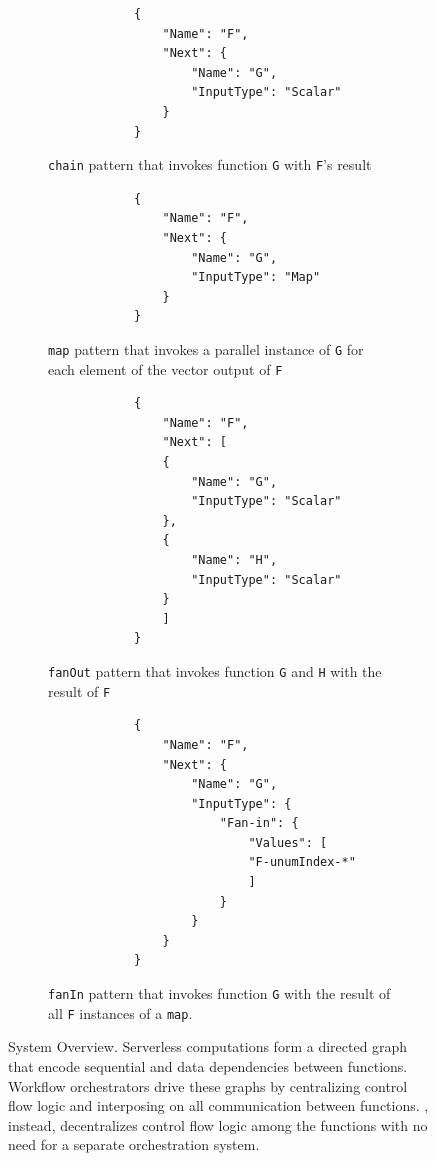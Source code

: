 \begin{figure}[t!]
	\centering
	\begin{subfigure}[t]{\columnwidth}
		\centering
		\begin{verbatim}
			{
				"Name": "F",
				"Next": {
					"Name": "G",
					"InputType": "Scalar"
				}
			}
		\end{verbatim}
		\caption{\texttt{chain} pattern that invokes function \texttt{G} with
			\texttt{F}'s result}
		\label{fig:gadget-examples-chain}
	\end{subfigure}
	\begin{subfigure}[t]{\columnwidth}
		\centering
		\begin{verbatim}
			{
				"Name": "F",
				"Next": {
					"Name": "G",
					"InputType": "Map"
				}
			}
		\end{verbatim}
		\caption{\texttt{map} pattern that invokes a parallel instance of
			\texttt{G} for each element of the vector output of \texttt{F}}
		\label{fig:gadget-examples-map}
	\end{subfigure}
	\hfill
	\begin{subfigure}[t]{\columnwidth}
		\centering
		\begin{verbatim}
			{
				"Name": "F",
				"Next": [
				{
					"Name": "G",
					"InputType": "Scalar"
				},
				{
					"Name": "H",
					"InputType": "Scalar"
				}
				]
			}
		\end{verbatim}
		\caption{\texttt{fanOut} pattern that invokes function \texttt{G} and
			\texttt{H} with the result of \texttt{F}}
		\label{fig:gadget-examples-fanout}
	\end{subfigure}
	\begin{subfigure}[t]{\columnwidth}
		\centering
		\begin{verbatim}
			{
				"Name": "F",
				"Next": {
					"Name": "G",
					"InputType": {
						"Fan-in": {
							"Values": [
							"F-unumIndex-*"
							]
						}
					}
				}
			}
		\end{verbatim}
		\caption{\texttt{fanIn} pattern that invokes function \texttt{G} with
			the result of all \texttt{F} instances of a \texttt{map}.}
		\label{fig:gadget-examples-fanin}
	\end{subfigure}
	\caption{\name{} System Overview. Serverless computations form a directed
		graph that encode sequential and data dependencies between functions. Workflow
		orchestrators drive these graphs by centralizing control flow logic and
		interposing on all communication between functions. \name{},
		instead, decentralizes control flow logic among the functions with
		no need for a separate orchestration system.}
	\label{fig:arch2}
\end{figure}



